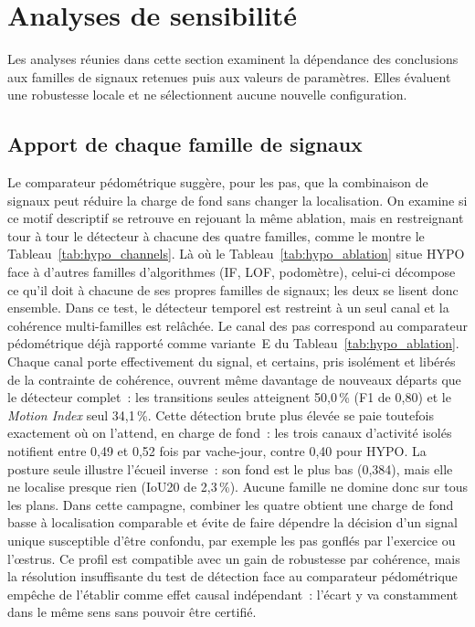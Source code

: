 \section{Analyses de sensibilité}
Les analyses réunies dans cette section examinent la dépendance des conclusions aux familles de signaux
retenues puis aux valeurs de paramètres. Elles évaluent une robustesse locale et ne
sélectionnent aucune nouvelle configuration.

\subsection{Apport de chaque famille de signaux}
Le comparateur pédométrique suggère, pour les pas, que la combinaison de signaux peut réduire la
charge de fond sans changer la localisation. On examine si ce motif descriptif se retrouve
en rejouant la même ablation, mais en restreignant tour à tour le détecteur à chacune
des quatre familles, comme le montre le Tableau~\ref{tab:hypo_channels}. Là où le
Tableau~\ref{tab:hypo_ablation}
situe HYPO face à d'autres familles d'algorithmes (IF, LOF, podomètre), celui-ci décompose ce
qu'il doit à chacune de ses propres familles de signaux; les deux se lisent donc ensemble.
Dans ce test, le détecteur temporel est restreint à un seul canal et la cohérence
multi-familles est relâchée. Le canal des pas correspond au comparateur pédométrique déjà
rapporté comme variante~E du Tableau~\ref{tab:hypo_ablation}.
Chaque canal porte effectivement du signal, et certains,
pris isolément et libérés de la contrainte de cohérence, ouvrent même davantage de nouveaux
départs que le détecteur complet~: les transitions seules atteignent 50,0\,\% (F1 de 0,80) et
le \textit{Motion Index} seul 34,1\,\%. Cette détection brute plus élevée se paie toutefois
exactement où on l'attend, en charge de fond~: les trois canaux d'activité isolés notifient
entre 0,49 et 0,52 fois par vache-jour, contre 0,40 pour HYPO. La posture seule illustre
l'écueil inverse~: son fond est le plus bas (0,384), mais elle ne localise presque rien
(IoU20 de 2,3\,\%). Aucune
famille ne domine donc sur tous les plans. Dans cette campagne, combiner les quatre obtient une
charge de fond basse à localisation comparable et évite de faire dépendre la décision d'un signal
unique susceptible d'être confondu, par exemple les pas gonflés par l'exercice ou l'œstrus. Ce
profil est compatible avec un gain de robustesse par cohérence, mais la résolution insuffisante du
test de détection face au comparateur pédométrique empêche de l'établir comme effet causal
indépendant~: l'écart y va constamment dans le même sens sans pouvoir être certifié.

